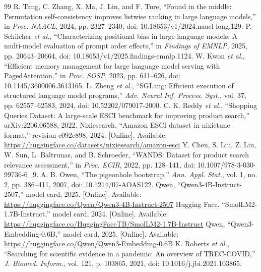 \documentclass[conference]{IEEEtran}
\begin{document}
\begin{thebibliography}{99}
 R. Tang, C. Zhang, X. Ma, J. Lin, and F. Ture, ``Found in the middle: Permutation self-consistency improves listwise ranking in large language models,'' in \emph{Proc. NAACL}, 2024, pp. 2327--2340, doi: 10.18653/v1/2024.naacl-long.129.
 P. Schilcher \emph{et al.}, ``Characterizing positional bias in large language models: A multi-model evaluation of prompt order effects,'' in \emph{Findings of EMNLP}, 2025, pp. 20643--20664, doi: 10.18653/v1/2025.findings-emnlp.1124.
 W. Kwon \emph{et al.}, ``Efficient memory management for large language model serving with PagedAttention,'' in \emph{Proc. SOSP}, 2023, pp. 611--626, doi: 10.1145/3600006.3613165.
 L. Zheng \emph{et al.}, ``SGLang: Efficient execution of structured language model programs,'' \emph{Adv. Neural Inf. Process. Syst.}, vol. 37, pp. 62557--62583, 2024, doi: 10.52202/079017-2000.
 C. K. Reddy \emph{et al.}, ``Shopping Queries Dataset: A large-scale ESCI benchmark for improving product search,'' arXiv:2206.06588, 2022.
 Nixiesearch, ``Amazon ESCI dataset in nixietune format,'' revision c092c898, 2024. [Online]. Available: \url{https://huggingface.co/datasets/nixiesearch/amazon-esci}
 Y. Chen, S. Liu, Z. Liu, W. Sun, L. Baltrunas, and B. Schroeder, ``WANDS: Dataset for product search relevance assessment,'' in \emph{Proc. ECIR}, 2022, pp. 128--141, doi: 10.1007/978-3-030-99736-6\_9.
 A. B. Owen, ``The pigeonhole bootstrap,'' \emph{Ann. Appl. Stat.}, vol. 1, no. 2, pp. 386--411, 2007, doi: 10.1214/07-AOAS122.
 Qwen, ``Qwen3-4B-Instruct-2507,'' model card, 2025. [Online]. Available: \url{https://huggingface.co/Qwen/Qwen3-4B-Instruct-2507}
 Hugging Face, ``SmolLM2-1.7B-Instruct,'' model card, 2024. [Online]. Available: \url{https://huggingface.co/HuggingFaceTB/SmolLM2-1.7B-Instruct}
 Qwen, ``Qwen3-Embedding-0.6B,'' model card, 2025. [Online]. Available: \url{https://huggingface.co/Qwen/Qwen3-Embedding-0.6B}
 K. Roberts \emph{et al.}, ``Searching for scientific evidence in a pandemic: An overview of TREC-COVID,'' \emph{J. Biomed. Inform.}, vol. 121, p. 103865, 2021, doi: 10.1016/j.jbi.2021.103865.
\end{thebibliography}
\end{document}
